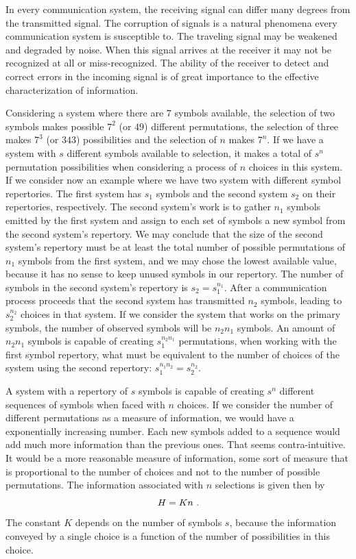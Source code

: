 In every communication system, the receiving signal can differ many degrees from the transmitted signal. 
The corruption of signals is a natural phenomena every communication system is susceptible to. 
The traveling signal may be weakened and degraded by noise. When this signal arrives at the receiver it 
may not be recognized at all or miss-recognized. The ability of the receiver to detect and correct errors 
in the incoming signal is of great importance to the effective characterization of information.

Considering a system where there are $7$ symbols available, the selection of two symbols makes 
possible $7^2$ (or $49$) different permutations, the selection of three makes $7^3$ (or $343$) possibilities 
and the selection of $n$ makes $7^n$. If we have a system with $s$ different symbols available to selection, 
it makes a total of $s^n$ permutation possibilities when considering a process of $n$ choices in this system.
If we consider now an example where we have two system with different symbol repertories. 
The first system has $s_1$ symbols and the second system $s_2$ on their repertories, respectively. 
The second system's work is to gather $n_1$ symbols emitted by the first system and assign to each set of symbols 
a new symbol from the second system's repertory. We may conclude that the size of the second system's repertory 
must be at least the total number of possible permutations of $n_1$ symbols from the first system, 
and we may chose the lowest available value, because it has no sense to keep unused symbols in our repertory. 
The number of symbols in the second system's repertory is $s_2 = s_1^{n_1}$. After a communication process proceeds 
that the second system has transmitted $n_2$ symbols, leading to $s_2^{n_2}$ choices in that system. 
If we consider the system that works on the primary symbols, the number of observed symbols will be $n_2 n_1$ symbols. 
An amount of $n_2 n_1$ symbols is capable of creating $s_1^{n_2 n_1}$ permutations, when working with the first symbol
repertory, what must be equivalent to the number of choices of the system using the second repertory: 
$s_1^{n_1 n_2} = s_2^{n_2}$.

A system with a repertory of $s$ symbols is capable of creating $s^n$ different sequences of symbols when faced 
with $n$ choices. If we consider the number of different permutations as a measure of information, 
we would have a exponentially increasing number. Each new symbols added to a sequence would add much more information 
than the previous ones. That seems contra-intuitive. It would be a more reasonable measure of information, 
some sort of measure that is proportional to the number of choices and not to the number of possible permutations. 
The information associated with $n$ selections is given then by
\begin{equation}
H = K n \textmd{ .}
\label{eq:HKn}
\end{equation}
The constant $K$ depends on the number of symbols $s$, because the information conveyed by a single choice is a 
function of the number of possibilities in this choice.

